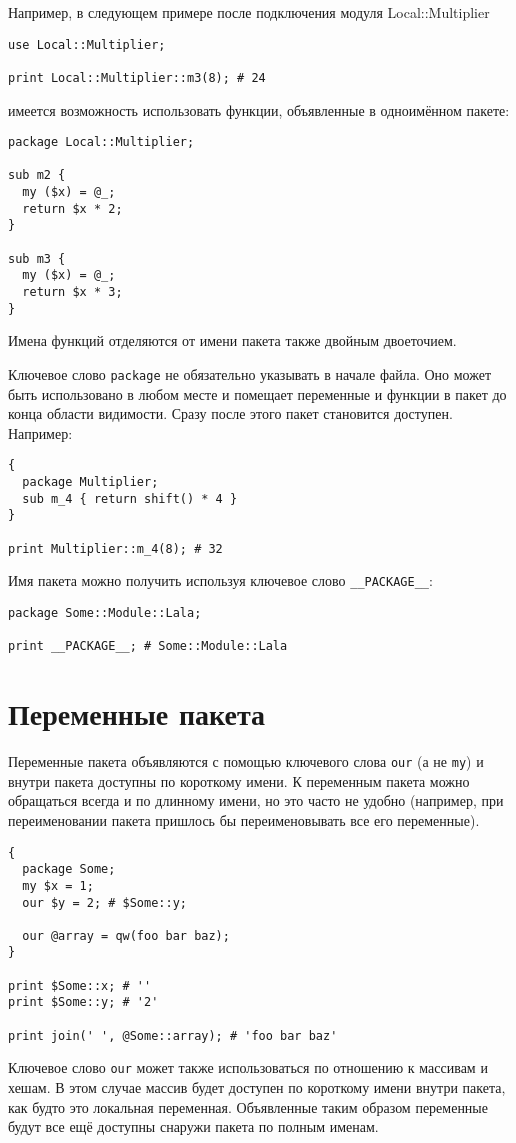 Например, в следующем примере после подключения модуля Local::Multiplier
\begin{verbatim}
use Local::Multiplier;

print Local::Multiplier::m3(8); # 24
\end{verbatim}
имеется возможность использовать функции, объявленные в одноимённом пакете:
\begin{verbatim}
package Local::Multiplier;

sub m2 {
  my ($x) = @_;
  return $x * 2;
}

sub m3 {
  my ($x) = @_;
  return $x * 3;
}
\end{verbatim}
Имена функций отделяются от имени пакета также двойным двоеточием.

Ключевое слово \verb|package| не обязательно указывать в начале файла. Оно может быть использовано в любом месте и помещает переменные и функции в пакет до конца области видимости. Сразу после этого пакет становится доступен. Например:
\begin{verbatim}
{
  package Multiplier;
  sub m_4 { return shift() * 4 }
}

print Multiplier::m_4(8); # 32
\end{verbatim}
 Имя пакета можно получить используя ключевое слово \verb|__PACKAGE__|:
\begin{verbatim}
package Some::Module::Lala;

print __PACKAGE__; # Some::Module::Lala
\end{verbatim}

\section{Переменные пакета}
Переменные пакета объявляются с помощью ключевого слова \verb|our| (а не \verb|my|) и внутри пакета доступны по короткому имени. К переменным пакета можно обращаться всегда и по длинному имени, но это часто не удобно (например, при переименовании пакета пришлось бы переименовывать все его переменные).
\begin{verbatim}
{
  package Some;
  my $x = 1;
  our $y = 2; # $Some::y;

  our @array = qw(foo bar baz);
}

print $Some::x; # ''
print $Some::y; # '2'

print join(' ', @Some::array); # 'foo bar baz'
\end{verbatim}
Ключевое слово \verb|our| может также использоваться по отношению к массивам и хешам. В этом случае массив будет доступен по короткому имени внутри пакета, как будто это локальная переменная. Объявленные таким образом переменные будут все ещё доступны снаружи пакета по полным именам.

